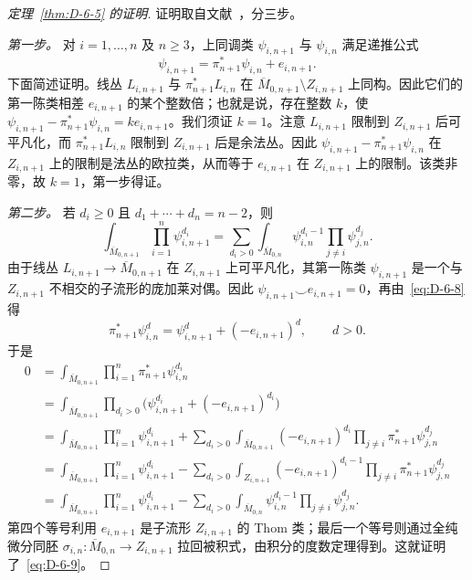 \begin{proof}[定理~\ref{thm:D-6-5} 的证明]
证明取自文献~，分三步。

\emph{第一步。} 对 $i=1,\ldots,n$ 及 $n\ge3$，上同调类 $\psi_{i,n+1}$ 与 $\psi_{i,n}$ 满足递推公式
\begin{equation}\label{eq:D-6-8}
  \psi_{i,n+1}=\pi_{n+1}^{*}\psi_{i,n}+e_{i,n+1}.
\end{equation}
下面简述证明。线丛 $L_{i,n+1}$ 与 $\pi_{n+1}^{*}L_{i,n}$ 在 $\overline M_{0,n+1}\setminus Z_{i,n+1}$ 上同构。因此它们的第一陈类相差 $e_{i,n+1}$ 的某个整数倍；也就是说，存在整数 $k$，使 $\psi_{i,n+1}-\pi_{n+1}^{*}\psi_{i,n}=k e_{i,n+1}$。我们须证 $k=1$。注意 $L_{i,n+1}$ 限制到 $Z_{i,n+1}$ 后可平凡化，而 $\pi_{n+1}^{*}L_{i,n}$ 限制到 $Z_{i,n+1}$ 后是余法丛。因此 $\psi_{i,n+1}-\pi_{n+1}^{*}\psi_{i,n}$ 在 $Z_{i,n+1}$ 上的限制是法丛的欧拉类，从而等于 $e_{i,n+1}$ 在 $Z_{i,n+1}$ 上的限制。该类非零，故 $k=1$，第一步得证。

\emph{第二步。} 若 $d_i\ge0$ 且 $d_1+\cdots+d_n=n-2$，则
\begin{equation}\label{eq:D-6-9}
  \int_{\overline M_{0,n+1}}\prod_{i=1}^{n}\psi_{i,n+1}^{d_i}
  =\sum_{d_i>0}\int_{\overline M_{0,n}}
    \psi_{i,n}^{d_i-1}\prod_{j\ne i}\psi_{j,n}^{d_j}.
\end{equation}
由于线丛 $L_{i,n+1}\to\overline M_{0,n+1}$ 在 $Z_{i,n+1}$ 上可平凡化，其第一陈类 $\psi_{i,n+1}$ 是一个与 $Z_{i,n+1}$ 不相交的子流形的庞加莱对偶。因此 $\psi_{i,n+1}\smile e_{i,n+1}=0$，再由~\eqref{eq:D-6-8} 得
\[
  \pi_{n+1}^{*}\psi_{i,n}^{d}
  =\psi_{i,n+1}^{d}+(-e_{i,n+1})^{d},\qquad d>0.
\]
于是
\begin{align*}
  0
  &=\int_{\overline M_{0,n+1}}\prod_{i=1}^{n}
       \pi_{n+1}^{*}\psi_{i,n}^{d_i}\\
  &=\int_{\overline M_{0,n+1}}\prod_{d_i>0}
       \bigl(\psi_{i,n+1}^{d_i}+(-e_{i,n+1})^{d_i}\bigr)\\
  &=\int_{\overline M_{0,n+1}}\prod_{i=1}^{n}\psi_{i,n+1}^{d_i}
    +\sum_{d_i>0}\int_{\overline M_{0,n+1}}
       (-e_{i,n+1})^{d_i}\prod_{j\ne i}
       \pi_{n+1}^{*}\psi_{j,n}^{d_j}\\
  &=\int_{\overline M_{0,n+1}}\prod_{i=1}^{n}\psi_{i,n+1}^{d_i}
    -\sum_{d_i>0}\int_{Z_{i,n+1}}
       (-e_{i,n+1})^{d_i-1}\prod_{j\ne i}
       \pi_{n+1}^{*}\psi_{j,n}^{d_j}\\
  &=\int_{\overline M_{0,n+1}}\prod_{i=1}^{n}\psi_{i,n+1}^{d_i}
    -\sum_{d_i>0}\int_{\overline M_{0,n}}
       \psi_{i,n}^{d_i-1}\prod_{j\ne i}\psi_{j,n}^{d_j}.
\end{align*}
第四个等号利用 $e_{i,n+1}$ 是子流形 $Z_{i,n+1}$ 的 Thom 类；最后一个等号则通过全纯微分同胚 $\sigma_{i,n}:\overline M_{0,n}\to Z_{i,n+1}$ 拉回被积式，由积分的度数定理得到。这就证明了~\eqref{eq:D-6-9}。


\end{proof}
